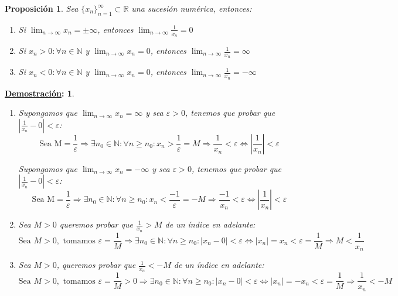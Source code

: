 \documentclass[10pt,a4paper,openright]{book}
\theoremstyle{break}
\newtheorem*{prop}{Proposición}
\newtheorem*{demo}{\underline{Demostración}:}
\begin{document}
\begin{prop}
Sea $\{x_n\}_{n=1}^\infty \subset \mathbb R$ una sucesión numérica, entonces:
\begin{enumerate}
\item Si $\lim_{n\rightarrow \infty} x_n=\pm \infty$, entonces $\lim_{n\rightarrow \infty} \frac{1}{x_n}=0$

\item Si $x_n>0: \forall n\in \mathbb N$ y $\lim_{n\rightarrow \infty} x_n=0$, entonces $\lim_{n\rightarrow \infty} \frac{1}{x_n}=\infty$

\item Si $x_n<0: \forall n\in \mathbb N$ y $\lim_{n\rightarrow \infty}x_n=0$, entonces $\lim_{n\rightarrow \infty} \frac{1}{x_n}=-\infty$
\end{enumerate}
\end{prop}
\begin{demo}
\begin{enumerate}
\item Supongamos que $\lim_{n\rightarrow \infty} x_n=\infty$ y sea $\varepsilon>0$, tenemos que probar que $|\frac{1}{x_n}-0|<\varepsilon$:
$$\mbox{Sea M}=\frac{1}{\varepsilon}\Rightarrow \exists n_0\in \mathbb N: \forall n\geq n_0: x_n> \frac{1}{\varepsilon}=M\Rightarrow \frac{1}{x_n}<\varepsilon\Leftrightarrow |\frac{1}{x_n}|<\varepsilon$$

Supongamos que $\lim_{n\rightarrow \infty} x_n=-\infty$ y sea $\varepsilon>0$, tenemos que probar que $|\frac{1}{x_n}-0|<\varepsilon$:
$$\mbox{Sea M}=\frac{1}{\varepsilon}\Rightarrow \exists n_0\in \mathbb N: \forall n\geq n_0: x_n< \frac{-1}{\varepsilon}=-M\Rightarrow \frac{-1}{x_n}<\varepsilon\Leftrightarrow |\frac{1}{x_n}|<\varepsilon$$

\item Sea $M>0$ queremos probar que $\frac{1}{x_n}>M$ de un índice en adelante:
$$\mbox{Sea }M>0,\mbox{ tomamos } \varepsilon=\frac{1}{M}\Rightarrow \exists n_0\in \mathbb N: \forall n\geq n_0: |x_n-0|<\varepsilon\Leftrightarrow |x_n|=x_n<\varepsilon=\frac{1}{M}\Rightarrow M<\frac{1}{x_n}$$

\item Sea $M>0$, queremos probar que $\frac{1}{x_n}<-M$ de un índice en adelante:
$$\mbox{Sea }M>0,\mbox{ tomamos }\varepsilon=\frac{1}{M}>0\Rightarrow \exists n_0\in \mathbb N: \forall n\geq n_0: |x_n-0|<\varepsilon\Leftrightarrow |x_n|=-x_n<\varepsilon=\frac{1}{M}\Rightarrow \frac{1}{x_n}<-M$$
\end{enumerate}
\end{demo}
\end{document}
